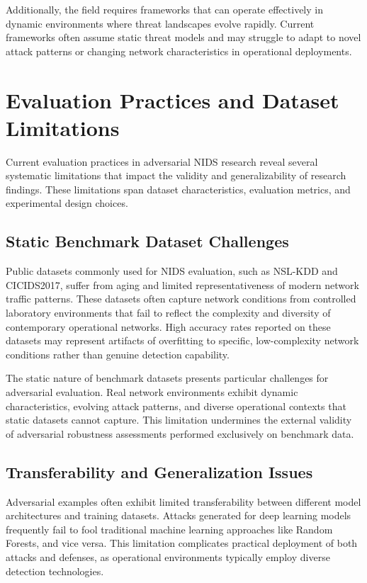 Additionally, the field requires frameworks that can operate effectively in dynamic environments where threat landscapes evolve rapidly. Current frameworks often assume static threat models and may struggle to adapt to novel attack patterns or changing network characteristics in operational deployments.

\section{Evaluation Practices and Dataset Limitations}
\label{sec:evaluation_limitations}

Current evaluation practices in adversarial NIDS research reveal several systematic limitations that impact the validity and generalizability of research findings. These limitations span dataset characteristics, evaluation metrics, and experimental design choices.

\subsection{Static Benchmark Dataset Challenges}

Public datasets commonly used for NIDS evaluation, such as NSL-KDD and CICIDS2017, suffer from aging and limited representativeness of modern network traffic patterns. These datasets often capture network conditions from controlled laboratory environments that fail to reflect the complexity and diversity of contemporary operational networks. High accuracy rates reported on these datasets may represent artifacts of overfitting to specific, low-complexity network conditions rather than genuine detection capability.

The static nature of benchmark datasets presents particular challenges for adversarial evaluation. Real network environments exhibit dynamic characteristics, evolving attack patterns, and diverse operational contexts that static datasets cannot capture. This limitation undermines the external validity of adversarial robustness assessments performed exclusively on benchmark data.

\subsection{Transferability and Generalization Issues}

Adversarial examples often exhibit limited transferability between different model architectures and training datasets. Attacks generated for deep learning models frequently fail to fool traditional machine learning approaches like Random Forests, and vice versa. This limitation complicates practical deployment of both attacks and defenses, as operational environments typically employ diverse detection technologies.

